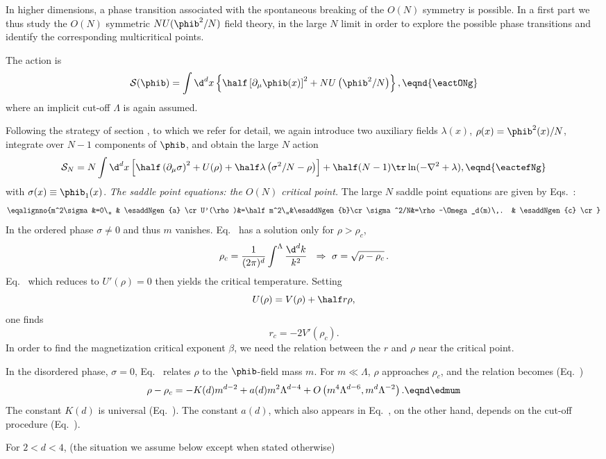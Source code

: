 In higher dimensions, a phase transition  associated with  the spontaneous breaking of the $O(N)$ symmetry is possible. In a first part we thus study the $O(N)$
symmetric $NU(\phib^2/N)$ field theory, in the large $N$ limit in
order  to explore the possible phase transitions and identify the
corresponding multicritical points. \par
 The action is\sslbl\smulticr
$${\cal S}(\phib)=  \int\d^d x \left\{\half \left[ \partial_{\mu} \phib (x)
\right]^{2} +NU\left(\phib^2/N\right) \right\} ,\eqnd{\eactONg}$$
where an implicit cut-off $\Lambda$ is again assumed. \par
Following the strategy of section \ssNbosgen, to which we refer for detail,
we again introduce two auxiliary fields $\lambda (x)$, $\rho (x)=\phib^2(x)/N$,
integrate over $N-1$ components of $\phib$,  and obtain the large $N$ action
$${\cal S}_N=N\int\d^d x \left[\half \left(\partial_\mu\sigma\right)^2+
U(\rho)+\half \lambda\left(\sigma^2/N- \rho\right)\right]+\half
(N-1)\tr\ln(-\nabla^2+\lambda ),\eqnd{\eactefNg}$$
with $\sigma (x)\equiv \phib_1(x)$.
%
\medskip
{\it The saddle point equations: the $O(N)$ critical point.}
The large $N$ saddle point equations are given by Eqs.~\esaddleN{}:
 \eqna\esaddNgen
$$\eqalignno{m^2\sigma&=0\,, & \esaddNgen{a} \cr
U'(\rho)&=\half m^2\,,&\esaddNgen{b}\cr
\sigma^2/N&=\rho-\Omega _d(m)\,. & \esaddNgen{c} \cr}$$
In the ordered phase $\sigma\ne0$ and thus $m$ vanishes.
Eq.~ has a solution only for $\rho>\rho_c$,
$$\rho_c={1\over (2\pi)^d }\int^\Lambda {\d^d k \over k^2}\ \ \Rightarrow\
\sigma=\sqrt{\rho-\rho_c}\,.$$
Eq.~ which reduces to $U'(\rho)=0$ then yields the critical temperature. Setting
$$U(\rho)=V(\rho)+\half r\rho ,$$ one finds
$$r_c=-2 V'(\rho_c).$$
In order to find the magnetization critical exponent $\beta$, we
need the relation between the $r$ and $\rho$ near the critical
point.
\par
 In the disordered phase, $\sigma=0$, Eq.~
relates $\rho$ to the $\phib$-field mass $m$. For $m\ll\Lambda$,
$\rho$ approaches $\rho_c$, and the relation becomes
(Eq.~\etadepolii)
$$\rho-\rho_c =-K(d)
m^{d-2}+a(d)m^2\Lambda^{d-4}
+O\left(m^4\Lambda^{d-6}, m^d \Lambda ^{-2}\right). \eqnd\edmum  $$
The constant $K(d)$ is universal (Eq.~\etadpolexp{a}).
The constant  $a(d)$, which also appears in Eq.~\etadepolii, on the other hand,
depends on the cut-off procedure (Eq.~\eadef). \par
For $2<d<4$, (the situation we  assume below except when stated otherwise)
